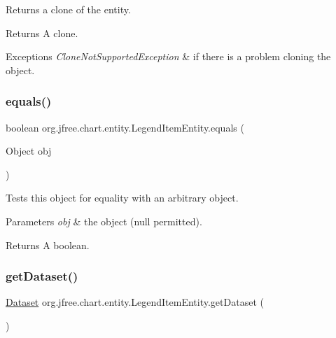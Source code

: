 Returns a clone of the entity.

\begin{DoxyReturn}{Returns}
A clone.
\end{DoxyReturn}

\begin{DoxyExceptions}{Exceptions}
{\em Clone\+Not\+Supported\+Exception} & if there is a problem cloning the object. \\
\hline
\end{DoxyExceptions}
\mbox{\label{classorg_1_1jfree_1_1chart_1_1entity_1_1_legend_item_entity_af6082c02d3b0dab06e4f05624369f695}} 
\subsubsection{\texorpdfstring{equals()}{equals()}}
{\footnotesize\ttfamily boolean org.\+jfree.\+chart.\+entity.\+Legend\+Item\+Entity.\+equals (\begin{DoxyParamCaption}\item[{Object}]{obj }\end{DoxyParamCaption})}

Tests this object for equality with an arbitrary object.


\begin{DoxyParams}{Parameters}
{\em obj} & the object ({\ttfamily null} permitted).\\
\hline
\end{DoxyParams}
\begin{DoxyReturn}{Returns}
A boolean. 
\end{DoxyReturn}
\mbox{\label{classorg_1_1jfree_1_1chart_1_1entity_1_1_legend_item_entity_ab76bb71b76b7f94a2f67c8d56900927a}} 
\subsubsection{\texorpdfstring{get\+Dataset()}{getDataset()}}
{\footnotesize\ttfamily \mbox{\hyperlink{interfaceorg_1_1jfree_1_1data_1_1general_1_1_dataset}{Dataset}} org.\+jfree.\+chart.\+entity.\+Legend\+Item\+Entity.\+get\+Dataset (\begin{DoxyParamCaption}{ }\end{DoxyParamCaption})}

